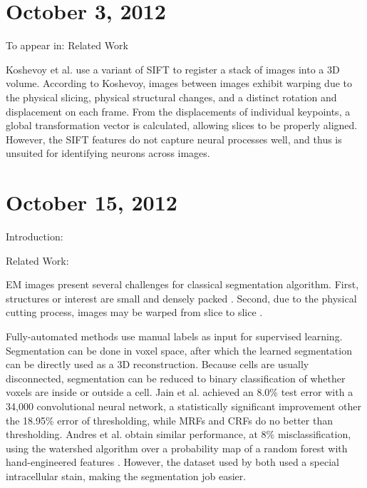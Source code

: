 \documentclass[draft]{article}
\begin{document}
\section*{October 3, 2012}
To appear in: Related Work


Koshevoy et al. \cite{Koshevoy2006} use a variant of SIFT \cite{Lowe2004} to register a stack of images into a 3D volume. According to Koshevoy, images between images exhibit warping due to the physical slicing, physical structural changes, and a distinct rotation and displacement on each frame. From the displacements of individual keypoints, a global transformation vector is calculated, allowing slices to be properly aligned. However, the SIFT features do not capture neural processes well, and thus is unsuited for identifying neurons across images.

\section*{October 15, 2012}
Introduction:

Related Work:

EM images present several challenges for classical segmentation algorithm. First, structures or interest are small and densely packed \cite{Jain2007}. Second, due to the physical cutting process, images may be warped from slice to slice \cite{Koshevoy2006}.


Fully-automated methods use manual labels as input for supervised learning. Segmentation can be done in voxel space, after which the learned segmentation can be directly used as a 3D reconstruction. Because cells are usually disconnected, segmentation can be reduced to binary classification of whether voxels are inside or outside a cell. Jain et al. \cite{Jain2007} achieved an 8.0\% test error with a 34,000 convolutional neural network, a statistically significant improvement other the 18.95\% error of thresholding, while MRFs and CRFs do no better than thresholding. Andres et al. obtain similar performance, at 8\% misclassification, using the watershed algorithm over a probability map of a random forest with hand-engineered features \cite{Andres2008, Gonzales2008}. However, the dataset used by both used a special intracellular stain, making the segmentation job easier.
\end{document}
